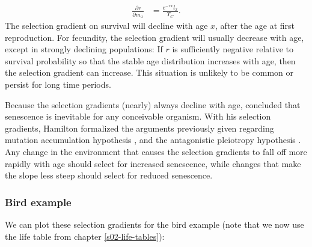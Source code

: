 \documentclass[
]{book}
\begin{document}
\begin{align} 
\frac{\partial r}{\partial m_x}&=\frac{e^{-rx}l_x}{T_C}.
\end{align}
The selection gradient on survival will decline with age \(x\), after the age at first reproduction. For fecundity, the selection gradient will usually decrease with age, except in strongly declining populations: If \(r\) is sufficiently negative relative to survival probability so that the stable age distribution increases with age, then the selection gradient can increase. This situation is unlikely to be common or persist for long time periods.

Because the selection gradients (nearly) always decline with age, \citet{Hamilton1} concluded that senescence is inevitable for any conceivable organism. With his selection gradients, Hamilton formalized the arguments previously given regarding mutation accumulation hypothesis \citep{Medawar1}, and the antagonistic pleiotropy hypothesis \citep{Williams1}. Any change in the environment that causes the selection gradients to fall off more rapidly with age should select for increased senescence, while changes that make the slope less steep should select for reduced senescence.

\hypertarget{bird-example-14}{%
\subsubsection*{Bird example}\label{bird-example-14}}

We can plot these selection gradients for the bird example (note that we now use the life table from chapter \ref{s02-life-tables}):
\end{document}
